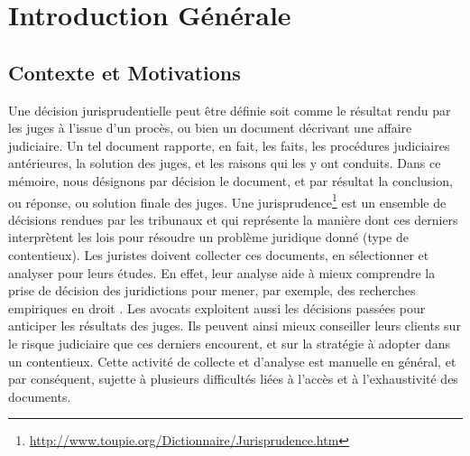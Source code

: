 \chapter*{Introduction Générale}
\label{chap:intro}

\section{Contexte et Motivations}
\label{sec:intro:contexte}
Une décision jurisprudentielle peut être définie soit comme  le résultat rendu par les juges à l'issue d'un procès, ou bien un document décrivant une affaire judiciaire. Un tel document rapporte, en fait,  les faits, les procédures judiciaires antérieures, la solution des juges, et les raisons qui les y ont conduits. Dans ce mémoire, nous désignons par \og décision \fg{} le document, et par  \og résultat\fg{} la conclusion, ou réponse, ou solution finale des juges. Une jurisprudence\footnote{\url{http://www.toupie.org/Dictionnaire/Jurisprudence.htm}} est un ensemble de décisions rendues par les tribunaux et qui représente la manière dont ces derniers interprètent les lois pour résoudre un problème juridique donné (type de contentieux). Les juristes doivent collecter ces documents, en sélectionner et analyser pour leurs études. En effet, leur analyse aide à mieux comprendre la prise de décision des juridictions pour mener, par exemple, des recherches empiriques en droit \citep{ancel2003expulsion, jeandidier2006pensions}. Les avocats exploitent aussi les décisions passées pour anticiper les résultats des juges. Ils peuvent ainsi mieux conseiller leurs clients sur le risque judiciaire que ces derniers encourent, et sur la stratégie à adopter dans un contentieux. Cette activité de collecte et d'analyse est manuelle en général, et par conséquent, sujette à plusieurs difficultés liées à l'accès et à l'exhaustivité des documents. 

